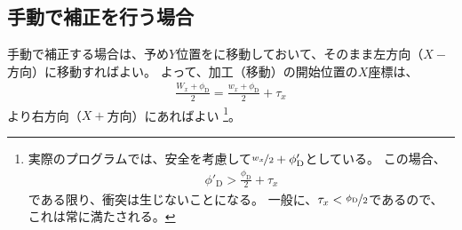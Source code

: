 \clearpage
\subsection{手動で補正を行う場合}
手動で補正する場合は、予め$Y$位置をに移動しておいて、そのまま左方向（$X-$方向）に移動すればよい。
よって、加工（移動）の開始位置の$X$座標は、
\begin{align*}
  \frac{W_x+\phi_\mathrm D}2 = \frac{w_x+\phi_\mathrm D}2+\tau_x
\end{align*}
より右方向（$X+$方向）にあればよい
\footnote{実際のプログラムでは、安全を考慮して$\nicefrac{w_x}2+\phi'_\mathrm D$としている。
この場合、
\begin{align*}
  \phi'_\mathrm D > \frac{\phi_\mathrm D}2+\tau_x
\end{align*}
である限り、衝突は生じないことになる。
一般に、$\tau_x < \nicefrac{\phi_\mathrm D}2$であるので、これは常に満たされる。}。
